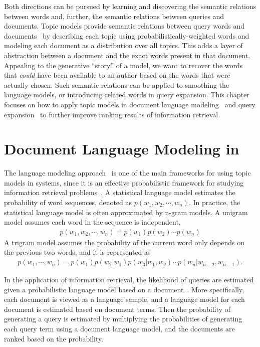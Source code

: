 Both directions can be pursued by learning and discovering the
semantic relations between words and, further, the semantic relations
between queries and documents. Topic models provide semantic relations between query words and
documents~\citep{deerwester-90,hofmann-99a} by describing each topic
using probabilistically-weighted words and modeling each document as a distribution over
all topics.
This adds a layer of abstraction between a document and the exact words present in that document.
Appealing to the generative ``story'' of a model, we want to recover the words that {\em could} have been available to an author based on the words that were actually chosen.
Such semantic relations
can be applied to smoothing the language models, or introducing
related words in query expansion. This chapter focuses on how to apply
topic models in document language modeling~\citep{Lu-2011,wei-06} and
query expansion~\citep{Park-2009,Andrzejewski-2011} to further improve
 ranking results of information retrieval.

\section{Document Language Modeling in }
\label{sec:ir-lm}

The language modeling approach~\citep{PonteCroft,song-99,croft-03} is
one of the main frameworks for using topic models in  systems, since
it is an effective probabilistic framework for studying
information retrieval problems~\citep{PonteCroft,berger-99}.
A statistical language model estimates the probability of word
sequences, denoted as $p(w_1,w_2,\cdots,w_n)$. In practice, the
statistical language model is often approximated by n-gram models. A
unigram model assumes each word in the sequence is independent,
\begin{align}
p(w_1,w_2,\cdots,w_n) = p(w_1)p(w_2) \cdots p(w_n)
\end{align}
A trigram model assumes the probability of the current word only
depends on the previous two words, and it is represented as
\begin{align}
p(w_1,\cdots,w_n)=p(w_1)p(w_2|w_1)p(w_3|w_1,w_2)\cdots p(w_n|w_{n-2},w_{n-1}).
\end{align}

In the application of information retrieval, the likelihood of queries
are estimated given a probabilistic language model based on a
document~\citep{zhai-01}. More specifically, each document is viewed
as a language sample, and a language model for each document is
estimated based on document terms. Then the
probability of generating a query is estimated by multiplying the probabilities of
generating each query term using a document language model,
and the documents are ranked based on the probability.

